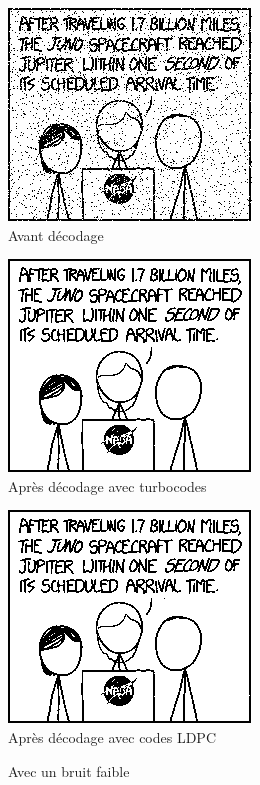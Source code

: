 \documentclass[12pt]{article}
\begin{document}
\begin{figure}[H]
	\begin{minipage}{\textwidth}
		\begin{minipage}{.3\textwidth}
			\centering
			\includegraphics[scale=0.5]{turbo_noisy_60}\\
			Avant d\'ecodage
		\end{minipage}
		\begin{minipage}{.3\textwidth}
			\centering
			\includegraphics[scale=0.5]{turbo_decoded_60}\\
			Apr\`es d\'ecodage avec turbocodes
		\end{minipage}
		\begin{minipage}{.3\textwidth}
			\centering
			\includegraphics[scale=0.5]{ldpc_basic_decoded_60}\\
			Apr\`es d\'ecodage avec codes LDPC
		\end{minipage}
	\end{minipage}
	\caption{Avec un bruit faible}
	\label{fig:faible}
\end{figure}
\end{document}
